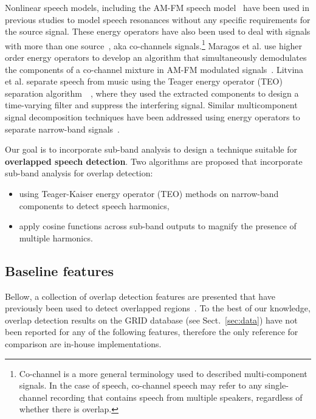 Nonlinear speech models, including the AM-FM speech model~\cite{maragos_kaiser_quatieri} have been used in previous studies to model speech resonances without any specific requirements for the source signal. 
These energy operators have also been used to deal with signals with more than one source~\cite{maragos_instantaneousenergy}, aka co-channels signals.\footnote{Co-channel is a more general terminology used to described multi-component signals. 
In the case of speech, co-channel speech may refer to any single-channel recording that contains speech from multiple speakers, regardless of whether there is overlap.}
Maragos et al. use higher order energy operators to develop an algorithm that simultaneously demodulates the components of a co-channel mixture in AM-FM modulated signals~\cite{maragos_instantaneousenergy}. 
Litvina et al. separate speech from music using the Teager energy operator (TEO) separation algorithm~\cite{maragos_kaiser_quatieri}~\cite{Litvin2010}, where they used the extracted components to design a time-varying filter and suppress the interfering signal. 
Similar multicomponent signal decomposition techniques have been addressed using energy operators to separate narrow-band signals~\cite{Linicassp95,hu12_nullspacepersuit,santhanam_maragos_2000}. 

Our goal is to incorporate sub-band analysis to design a technique suitable for {\bf overlapped speech detection}. 
Two algorithms are proposed that incorporate sub-band analysis for overlap detection: 
\begin{itemize}
	\item using Teager-Kaiser energy operator (TEO) methods on narrow-band components to detect speech harmonics, 
	\item apply cosine functions across sub-band outputs to magnify the presence of multiple harmonics. 
\end{itemize}



\subsection{Baseline features}
\label{ssec:baseline}
Bellow, a collection of overlap detection features are presented that have previously been used to detect overlapped regions~\cite{nav_icassp13,boakye_thesis,sapvr_2000}. 
To the best of our knowledge, overlap detection results on the GRID database (see Sect.~\ref{sec:data}) have not been reported for any of the following features, therefore the only reference for comparison are in-house implementations. %

